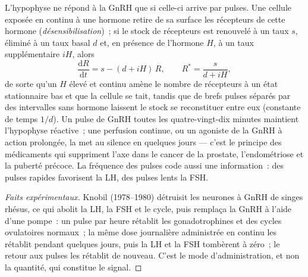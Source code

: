 \begin{proposition}\label{prop:b2:reproductive-hormones:pulses}
L'hypophyse ne répond à la GnRH que si celle-ci arrive par pulses. Une
cellule exposée en continu à une hormone retire de sa surface les
récepteurs de cette hormone (\emph{désensibilisation})~; si le stock de
récepteurs est renouvelé à un taux $s$, éliminé à un taux basal $d$ et,
en présence de l'hormone $H$, à un taux supplémentaire $iH$, alors
\[
\frac{\mathrm{d}R}{\mathrm{d}t} = s - (d + iH)\,R, \qquad R^* = \frac{s}{d + iH},
\]
de sorte qu'un $H$ élevé et continu amène le nombre de récepteurs à un
état stationnaire bas et que la cellule se tait, tandis que de brefs
pulses séparés par des intervalles sans hormone laissent le stock se
reconstituer entre eux (constante de temps $1/d$). Un pulse de GnRH
toutes les quatre-vingt-dix minutes maintient l'hypophyse réactive~; une
perfusion continue, ou un agoniste de la GnRH à action prolongée, la met
au silence en quelques jours --- c'est le principe des médicaments qui
suppriment l'axe dans le cancer de la prostate, l'endométriose et la
puberté précoce. La fréquence des pulses code aussi une information~:
des pulses rapides favorisent la LH, des pulses lents la FSH.
\end{proposition}
\begin{proof}[Faits expérimentaux]
Knobil (1978--1980) détruisit les neurones à GnRH de singes rhésus, ce
qui abolit la LH, la FSH et le cycle, puis remplaça la GnRH à l'aide
d'une pompe~: un pulse par heure rétablit les gonadotrophines et des
cycles ovulatoires normaux~; la même dose journalière administrée en
continu les rétablit pendant quelques jours, puis la LH et la FSH
tombèrent à zéro~; le retour aux pulses les rétablit de nouveau. C'est
le mode d'administration, et non la quantité, qui constitue le signal.
\end{proof}

